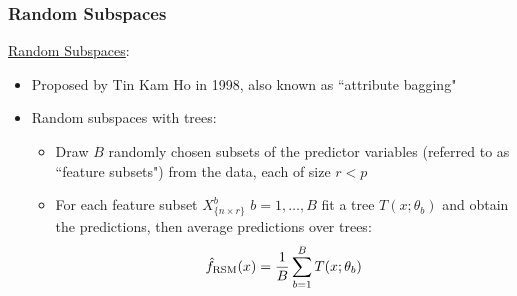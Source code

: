\documentclass{beamer}
\begin{document}
\begin{frame}

    \frametitle{Random Subspaces}
    
    \underline{Random Subspaces}:
    \medskip
    
    \begin{itemize}
        \item Proposed by Tin Kam Ho in 1998, also known as ``attribute bagging"
        \medskip
        \item Random subspaces with trees:
        \begin{itemize}
            \small
            \item Draw $B$ randomly chosen subsets of the predictor variables
                  (referred to as ``feature subsets") from the data, each of size 
                  $r < p$
            \item For each feature subset $X^{b}_{\{n \times r\}}$ $b = 1,\dots,B$ 
                  fit a tree $T(x; \theta_b)$ and obtain the predictions, then
                  average predictions over trees:
            \begin{equation}
                \small
                    \hat{f}_\text{RSM}(x) = 
                    \frac{1}{B} \sum_{b=1}^B T(x; \theta_b)
                \end{equation}
        \end{itemize}
    \end{itemize}

\end{frame}


\end{document}
